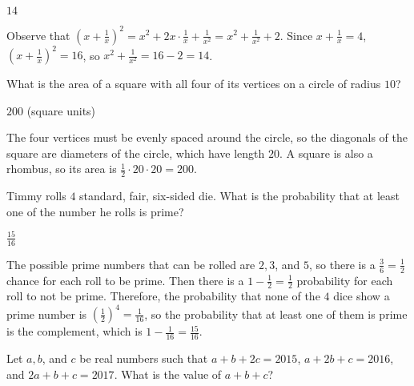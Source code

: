 \documentclass[11pt]{article}
\begin{document}
\begin{answer}
$\boxed{14}$
\end{answer}

\begin{solution}
Observe that $\left(x + \frac{1}{x}\right)^2 = x^2 + 2x \cdot \frac{1}{x} + \frac{1}{x^2} = x^2 + \frac{1}{x^2} + 2$. Since $x + \frac{1}{x} = 4$, $\left(x + \frac{1}{x}\right)^2 = 16$, so $x^2 + \frac{1}{x^2} = 16 - 2 = \boxed{14}$.
\end{solution}


\begin{problem}
What is the area of a square with all four of its vertices on a circle of radius $10$?
\end{problem}

\begin{answer}
$\boxed{200}$ (square units)
\end{answer}

\begin{solution}
The four vertices must be evenly spaced around the circle, so the diagonals of the square are diameters of the circle, which have length $20$. A square is also a rhombus, so its area is $\frac{1}{2} \cdot 20 \cdot 20 = \boxed{200}$.
\end{solution}


\begin{problem}
Timmy rolls $4$ standard, fair, six-sided die. What is the probability that at least one of the number he rolls is prime?
\end{problem}

\begin{answer}
$\boxed{\frac{15}{16}}$
\end{answer}

\begin{solution}
The possible prime numbers that can be rolled are $2, 3$, and $5$, so there is a $\frac{3}{6} = \frac{1}{2}$ chance for each roll to be prime. Then there is a $1 - \frac{1}{2} = \frac{1}{2}$ probability for each roll to not be prime. Therefore, the probability that none of the $4$ dice show a prime number is $\left(\frac{1}{2}\right)^4 = \frac{1}{16}$, so the probability that at least one of them is prime is the complement, which is $1 - \frac{1}{16} = \boxed{\frac{15}{16}}$.
\end{solution}


\begin{problem}
Let $a, b$, and $c$ be real numbers such that $a+b+2c = 2015$, $a+2b+c = 2016$, and $2a+b+c=2017$. What is the value of $a+b+c$?
\end{problem}
\end{document}
